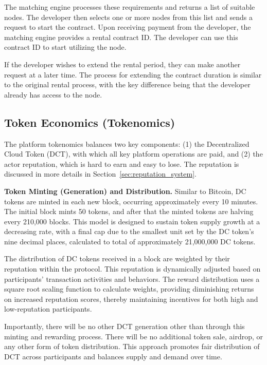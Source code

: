 The matching engine processes these requirements and returns a list of suitable nodes. The developer then selects one or more nodes from this list and sends a request to start the contract. Upon receiving payment from the developer, the matching engine provides a rental contract ID. The developer can use this contract ID to start utilizing the node.

If the developer wishes to extend the rental period, they can make another request at a later time. The process for extending the contract duration is similar to the original rental process, with the key difference being that the developer already has access to the node.


\subsection{Token Economics (Tokenomics)}
\label{sec:token_economics}

The platform tokenomics balances two key components: (1) the Decentralized Cloud Token (DCT), with which all key platform operations are paid, and (2) the actor reputation, which is hard to earn and easy to lose. The reputation is discussed in more details in Section~\ref{sec:reputation_system}.

{\bf Token Minting (Generation) and Distribution.}
Similar to Bitcoin, DC tokens are minted in each new block, occurring approximately every 10 minutes. The initial block mints 50 tokens, and after that the minted tokens are halving every 210,000 blocks. This model is designed to sustain token supply growth at a decreasing rate, with a final cap due to the smallest unit set by the DC token's nine decimal places, calculated to total of approximately 21,000,000 DC tokens.

The distribution of DC tokens received in a block are weighted by their reputation within the protocol. This reputation is dynamically adjusted based on participants' transaction activities and behaviors. The reward distribution uses a square root scaling function to calculate weights, providing diminishing returns on increased reputation scores, thereby maintaining incentives for both high and low-reputation participants.

Importantly, there will be no other DCT generation other than through this minting and rewarding process. There will be no additional token sale, airdrop, or any other form of token distribution. This approach promotes fair distribution of DCT across participants and balances supply and demand over time.

